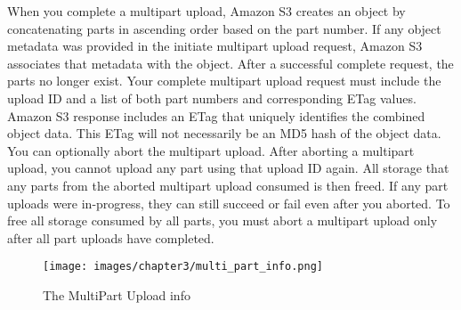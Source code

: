 When you complete a multipart upload, Amazon S3 creates an object by concatenating parts in ascending order based on the part number. If any object metadata was provided in the initiate multipart upload request, Amazon S3 associates that metadata with the object. After a successful complete request, the parts no longer exist. Your complete multipart upload request must include the upload ID and a list of both part numbers and corresponding ETag values. Amazon S3 response includes an ETag that uniquely identifies the combined object data. This ETag will not necessarily be an MD5 hash of the object data. You can optionally abort the multipart upload. After aborting a multipart upload, you cannot upload any part using that upload ID again. All storage that any parts from the aborted multipart upload consumed is then freed. If any part uploads were in-progress, they can still succeed or fail even after you aborted. To free all storage consumed by all parts, you must abort a multipart upload only after all part uploads have completed.

\begin{figure}[htb] %
 \centering
 \texttt{[image: images/chapter3/multi\_part\_info.png]}\hfill
 \caption[Multi part Upload info]{The MultiPart Upload info}
 \label{fig:fourV}
\end{figure}
